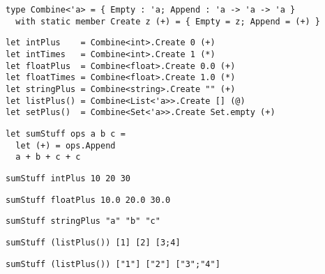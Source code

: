 \documentclass{beamer}
\begin{document}
\begin{frame}[fragile]
\begin{lstlisting}
type Combine<'a> = { Empty : 'a; Append : 'a -> 'a -> 'a }
  with static member Create z (+) = { Empty = z; Append = (+) }
\end{lstlisting}
\end{frame}

\begin{frame}[fragile]
\begin{lstlisting}
let intPlus    = Combine<int>.Create 0 (+)
let intTimes   = Combine<int>.Create 1 (*)
let floatPlus  = Combine<float>.Create 0.0 (+)
let floatTimes = Combine<float>.Create 1.0 (*)
let stringPlus = Combine<string>.Create "" (+)
let listPlus() = Combine<List<'a>>.Create [] (@)
let setPlus()  = Combine<Set<'a>>.Create Set.empty (+)
\end{lstlisting}
\end{frame}

\begin{frame}[fragile]
\begin{lstlisting}
let sumStuff ops a b c =
  let (+) = ops.Append
  a + b + c + c
\end{lstlisting}
\end{frame}

\begin{frame}[fragile]
\begin{lstlisting}
sumStuff intPlus 10 20 30
\end{lstlisting}
\end{frame}

\begin{frame}[fragile]
\begin{lstlisting}
sumStuff floatPlus 10.0 20.0 30.0
\end{lstlisting}
\end{frame}

\begin{frame}[fragile]
\begin{lstlisting}
sumStuff stringPlus "a" "b" "c"
\end{lstlisting}
\end{frame}

\begin{frame}[fragile]
\begin{lstlisting}
sumStuff (listPlus()) [1] [2] [3;4]
\end{lstlisting}
\end{frame}

\begin{frame}[fragile]
\begin{lstlisting}
sumStuff (listPlus()) ["1"] ["2"] ["3";"4"]
\end{lstlisting}
\end{frame}
\end{document}
